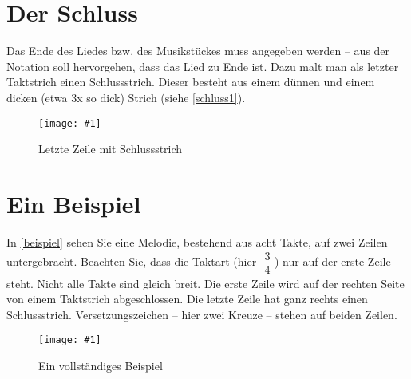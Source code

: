 \documentclass[10pt,a4paper,twoside]{report}
\newcommand{\comment}[1]{\marginpar{\begin{flushleft}
            \textsf{#1}
        \end{flushleft}}}
\newcommand{\image}[4]{
	\begin{figure}[!ht]
		\centering
		\texttt{[image: \#1]}
		\caption{#2}
		\label{#3}
	\end{figure}
}
\begin{document}
\section{Der Schluss}
Das Ende des Liedes bzw. des Musikstückes muss angegeben werden --
aus der Notation soll hervorgehen, dass das Lied zu Ende ist.
Dazu malt man als letzter Taktstrich einen Schlussstrich. 
\comment{Schlussstrich}
Dieser besteht
aus einem dünnen und einem dicken (etwa 3x so dick) Strich 
(siehe \autoref{schluss1}).

\image{img/schluss1-1.png}{Letzte Zeile mit Schlussstrich}{schluss1}{12}

\section{Ein Beispiel}
In \autoref{beispiel} sehen Sie eine Melodie, bestehend aus acht Takte,
auf zwei Zeilen untergebracht. Beachten Sie, dass die Taktart (hier
$\begin{smallmatrix}3\\4\end{smallmatrix}$) nur auf der erste Zeile steht.
Nicht alle Takte sind gleich breit. Die erste Zeile wird auf der rechten Seite
von einem Taktstrich abgeschlossen. Die letzte Zeile hat ganz rechts
einen Schlussstrich.
Versetzungszeichen -- hier zwei Kreuze -- stehen auf beiden Zeilen.


\image{img/beispiel-1.png}{Ein vollständiges Beispiel}{beispiel}{12}
\end{document}
